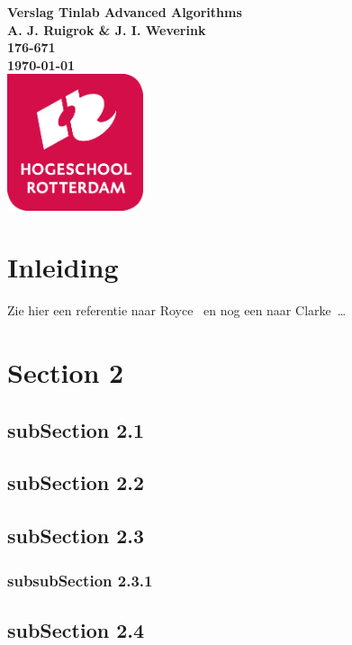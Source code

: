 \documentclass{article}
\begin{document}
\sffamily
\begin{titlepage}
  \centering
    \vfill
    {\bfseries\Huge
      Verslag Tinlab Advanced Algorithms \\
        \vskip2cm
      }
      {\bfseries\Large
        A. J. Ruigrok \& J. I. Weverink\\
      }
      {
        \bfseries\normalsize
        176-671\\
        \vskip1cm
        \today\\
    }
    \vfill
    \includegraphics[width=4cm]{logohr.png} %
    \vfill
    \vfill
\end{titlepage}
\newpage
\tableofcontents

\newpage
\section{Inleiding}
Zie hier een referentie naar Royce~\cite{royce1987managing} en nog een naar Clarke~\cite{modelchecking}\ldots 

\section{Section 2}
\subsection{subSection 2.1}
\subsection{subSection 2.2}
\subsection{subSection 2.3}
\subsubsection{subsubSection 2.3.1}
\subsection{subSection 2.4}
\end{document}
